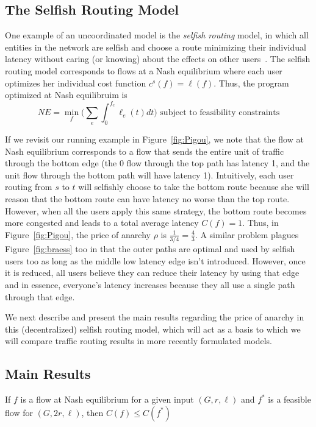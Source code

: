 \subsection{The Selfish Routing Model}
One example of an uncoordinated model is the \emph{selfish routing} model, in which all entities in the network are selfish and choose a route minimizing their individual latency without caring (or knowing) about the effects on other users~\cite{tardos}.
The selfish routing model corresponds to flows at a Nash equilibrium where each user optimizes her individual cost function
$c^s(f) = \ell(f)$.
Thus, the program optimized at Nash equilibruim is
$$NE = \min_f\Big(\sum_e \int_0^{f_e} \ell_e(t)dt\Big) \text{ subject to feasibility constraints}$$

If we revisit our running example in Figure~\ref{fig:Pigou}, we note that the flow at Nash equilibrium corresponds to a flow that sends the entire unit of traffic through the bottom edge (the 0 flow through the top path has latency 1, and the unit flow through the bottom path will have latency 1).
Intuitively, each user routing from $s$ to $t$ will selfishly choose to take the bottom route because she will reason that the bottom route can have latency no worse than the top route. However, when all the users apply this same strategy, the bottom route becomes more congested and leads to a total average latency $C(f) = 1$.
Thus, in Figure~\ref{fig:Pigou}, the price of anarchy $\rho$ is $\frac{1}{3/4} = \frac{4}{3}$. A similar problem plagues Figure~\ref{fig:braess} too in that the outer paths are optimal and used by selfish users too as long as the 
middle low latency edge isn't introduced. However, once it is reduced, all users believe they can reduce their latency by using that edge and in essence, everyone's latency increases because they all use a single path through that
edge.

We next describe and present the main results regarding the price of anarchy in this (decentralized) selfish routing model, which will act as a basis to which we will compare traffic routing results in more recently formulated models.

\subsection{Main Results}
\begin{theorem}
    If $f$ is a flow at Nash equilibrium for a given input $(G, r, \ell)$ and $f^*$ is a feasible flow for $(G, 2r, \ell)$, then $C(f) \leq C(f^*)$
\end{theorem}

